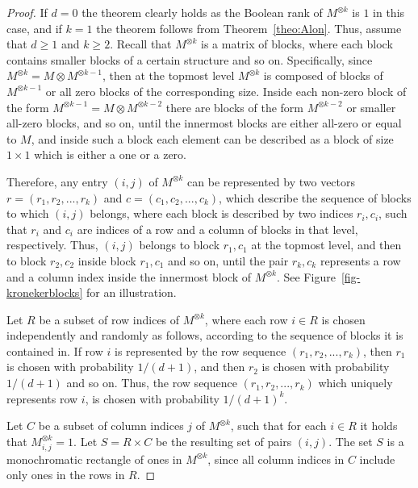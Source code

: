\documentclass[10pt,a4paper]{amsart}
\begin{document}
\begin{proof}
If $d = 0$ the theorem clearly holds as the Boolean rank of $M^{\otimes k}$ is  $1$ in this case, and if $k = 1$  the theorem follows from Theorem~\ref{theo:Alon}.
Thus, assume that $d \geq 1$ and $k \geq 2$.
Recall that $M^{\otimes k}$ is a matrix of blocks, where each block contains smaller blocks of a certain structure and so on.
Specifically, since $M^{\otimes k} = M \otimes M^{\otimes k-1}$, then at the topmost level $M^{\otimes k}$ is composed of blocks of $M^{\otimes k-1}$ or all zero blocks of the corresponding size.
Inside each non-zero block of the form $M^{\otimes k-1} = M \otimes M^{\otimes k-2}$ there are blocks of the form $M^{\otimes k-2}$ or smaller all-zero blocks, and so on,
until the innermost blocks are either all-zero or equal to $M$, and inside such a block each element can be described as a block of size $1 \times 1$ which is either a one or a zero.

Therefore, any entry $(i,j)$ of $M^{\otimes k}$ can be represented by two vectors $r = (r_1,r_2,...,r_k)$ and $c = (c_1,c_2,...,c_k)$,
which describe the sequence of blocks to which $(i,j)$ belongs, where each block is described by two indices $r_i,c_i$,
such that $r_i$ and $c_i$ are indices of a row and a column of blocks in that level, respectively.
Thus, $(i,j)$ belongs to block $r_1,c_1$ at the topmost level, and then to block  $r_2,c_2$ inside block $r_1,c_1$ and so on,
until the pair $r_k,c_k$ represents a row and a column index inside the innermost block of $M^{\otimes k}$. See Figure~\ref{fig-kronekerblocks} for an illustration.

Let $R$ be a subset of row indices of $M^{\otimes k}$, where each row $i \in R$ is chosen independently and randomly as follows,
according to the sequence of blocks it is contained in. If row $i$ is represented by the row sequence $(r_1,r_2,...,r_k)$,
then  $r_1$ is chosen with probability $1/(d+1)$, and then  $r_2$ is chosen with probability $1/(d+1)$ and so on.
Thus, the row sequence $(r_1,r_2,...,r_k)$ which uniquely represents row $i$, is chosen with probability $1/(d+1)^k$.

Let $C$ be a subset of column indices $j$ of $M^{\otimes k}$, such that for each $i \in R$ it holds that $M^{\otimes k}_{i,j} = 1$.
Let $S  = R \times C$ be the resulting set of pairs $(i,j)$.
The set $S$ is a monochromatic rectangle of ones in $M^{\otimes k}$, since all column indices in $C$ include only ones in the rows in $R$.


\end{proof}
\end{document}
